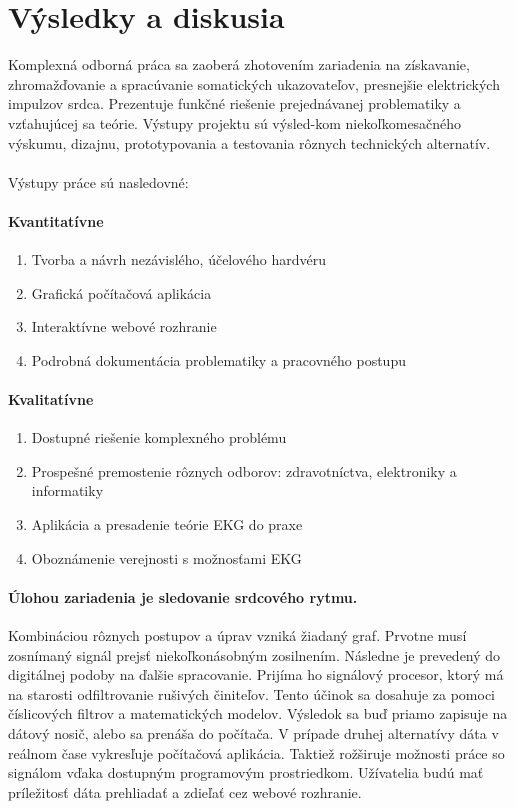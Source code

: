 \documentclass[titlepage,12pt]{article}
\begin{document}
\newpage
\section{Výsledky a diskusia}
Komplexná odborná práca sa zaoberá zhotovením zariadenia na získavanie, zhromažďovanie a spracúvanie somatických ukazovateľov, presnejšie elektrických impulzov srdca. Prezentuje funkčné riešenie prejednávanej problematiky a vzťahujúcej sa teórie. Výstupy projektu sú výsled-kom niekoľkomesačného výskumu, dizajnu, prototypovania a testovania rôznych technických alternatív.
\\
\\
Výstupy práce sú nasledovné:
\paragraph{\textbf{Kvantitatívne}}
\begin{enumerate}
	\item Tvorba a návrh nezávislého, účelového hardvéru
	\item Grafická počítačová aplikácia
	\item Interaktívne webové rozhranie
	\item Podrobná dokumentácia problematiky a pracovného postupu
\end{enumerate}
\paragraph{\textbf{Kvalitatívne}}
\begin{enumerate}
	\item Dostupné riešenie komplexného problému
	\item Prospešné premostenie rôznych odborov: zdravotníctva, elektroniky a informatiky
	\item Aplikácia a presadenie teórie EKG do praxe
	\item Oboznámenie verejnosti s možnosťami EKG
\end{enumerate}


\paragraph{Úlohou zariadenia je sledovanie srdcového rytmu.} Kombináciou rôznych postupov a úprav vzniká žiadaný graf. Prvotne musí zosnímaný signál prejsť niekoľkonásobným zosilnením. Následne je prevedený do digitálnej podoby na ďalšie spracovanie. Prijíma ho signálový procesor, ktorý má na starosti odfiltrovanie rušivých činiteľov. Tento účinok sa dosahuje za pomoci číslicových filtrov a matematických modelov. Výsledok sa buď priamo zapisuje na dátový nosič, alebo sa prenáša do počítača. V prípade druhej alternatívy dáta v reálnom čase vykresľuje počítačová aplikácia. Taktiež rožširuje možnosti práce so signálom vďaka dostupným programovým prostriedkom. Užívatelia budú mať príležitosť dáta prehliadať a zdieľať cez webové rozhranie.
\end{document}

